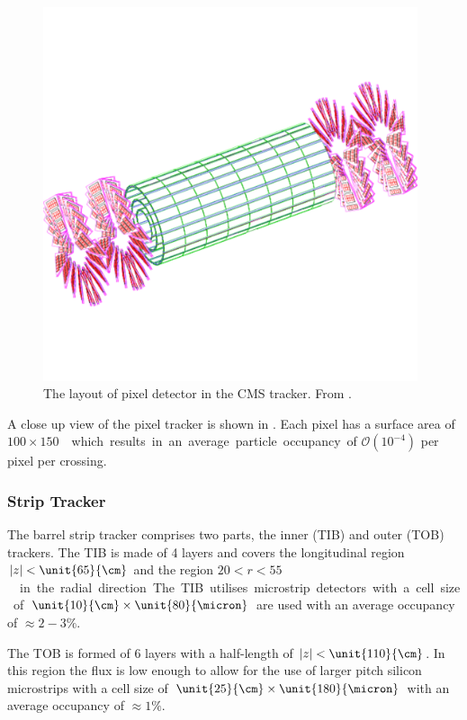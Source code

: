 \begin{figure}[htbp]
  \centering
  \includegraphics[width=0.98\textwidth]{pixel}
  \caption{The layout of pixel detector in the CMS tracker. From \cite{chatrchyan2008cms}.}
  \label{fig:pixel}
\end{figure}

A close up view of the pixel tracker is shown in .  
Each pixel has a surface area of \unit{$100\times150$}{\micron} which results in
an average particle occupancy of $\mathcal{O}(10^{-4})$ per pixel per crossing.

\subsubsection{Strip Tracker}
The barrel strip tracker comprises two parts, the inner (TIB) and outer (TOB)
trackers.  The TIB is made of 4 layers and covers the longitudinal region $|z|
< \unit{65}{\cm}$ and the region \unit{$20<r<55$}{\cm} in the radial direction.
The TIB utilises microstrip detectors with a cell size of
$\unit{10}{\cm}\times\unit{80}{\micron}$ are used with an average occupancy of
$\approx\unit{2-3}{\%}$.

The TOB is formed of 6 layers with a half-length of $|z| < \unit{110}{\cm}$. In
this region the flux is low enough to allow for the use of larger pitch
silicon microstrips with a cell size of
$\unit{25}{\cm}\times\unit{180}{\micron}$ with an average occupancy of
$\approx\unit{1}{\%}$.

